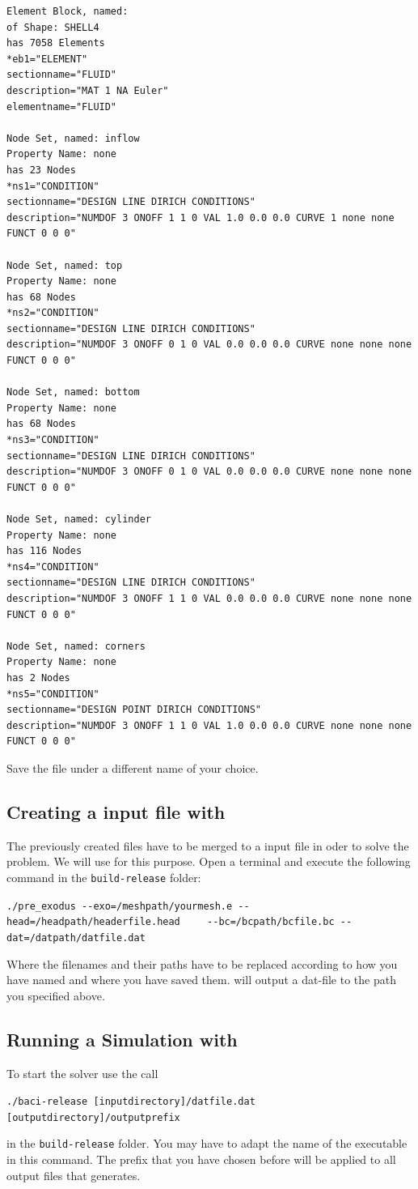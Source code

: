  \begin{small} \begin{verbatim}
Element Block, named:
of Shape: SHELL4
has 7058 Elements
*eb1="ELEMENT"
sectionname="FLUID"
description="MAT 1 NA Euler"
elementname="FLUID"

Node Set, named: inflow
Property Name: none
has 23 Nodes
*ns1="CONDITION"
sectionname="DESIGN LINE DIRICH CONDITIONS"
description="NUMDOF 3 ONOFF 1 1 0 VAL 1.0 0.0 0.0 CURVE 1 none none FUNCT 0 0 0"

Node Set, named: top
Property Name: none
has 68 Nodes
*ns2="CONDITION"
sectionname="DESIGN LINE DIRICH CONDITIONS"
description="NUMDOF 3 ONOFF 0 1 0 VAL 0.0 0.0 0.0 CURVE none none none FUNCT 0 0 0"

Node Set, named: bottom
Property Name: none
has 68 Nodes
*ns3="CONDITION"
sectionname="DESIGN LINE DIRICH CONDITIONS"
description="NUMDOF 3 ONOFF 0 1 0 VAL 0.0 0.0 0.0 CURVE none none none FUNCT 0 0 0"

Node Set, named: cylinder
Property Name: none
has 116 Nodes
*ns4="CONDITION"
sectionname="DESIGN LINE DIRICH CONDITIONS"
description="NUMDOF 3 ONOFF 1 1 0 VAL 0.0 0.0 0.0 CURVE none none none FUNCT 0 0 0"

Node Set, named: corners
Property Name: none
has 2 Nodes
*ns5="CONDITION"
sectionname="DESIGN POINT DIRICH CONDITIONS"
description="NUMDOF 3 ONOFF 1 1 0 VAL 1.0 0.0 0.0 CURVE none none none FUNCT 0 0 0"
 \end{verbatim} \end{small}
Save the file under a different name of your choice.

\subsection{Creating a \baci{} input file with \prexo}
The previously created files have to be merged to a \baci{} input file in oder
to solve the problem. We will use \prexo for this purpose. Open a terminal
and execute the following command in the \texttt{build-release} folder:
\begin{center}
  \verb|./pre_exodus --exo=/meshpath/yourmesh.e --head=/headpath/headerfile.head|
  \verb|	--bc=/bcpath/bcfile.bc --dat=/datpath/datfile.dat|
\end{center}
Where the filenames and their paths have to be replaced according to how you have named and where you have saved them.
\prexo will output a dat-file to the path you specified above.


\subsection{Running a Simulation with \baci{}}
\label{tut_fluid_preexo:baci}
To start the solver use the call
\begin{center}
	\verb|./baci-release [inputdirectory]/datfile.dat [outputdirectory]/outputprefix|
\end{center}
in the \texttt{build-release} folder. You may have to adapt the name of the executable
in this command. The prefix that you have chosen before will
be applied to all output files that \baci{} generates.


